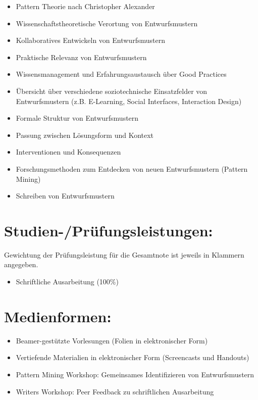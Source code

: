 \begin{itemize}
\tightlist
\item
  Pattern Theorie nach Christopher Alexander
\item
  Wissenschaftstheoretische Verortung von Entwurfsmustern
\item
  Kollaboratives Entwickeln von Entwurfsmustern
\item
  Praktische Relevanz von Entwurfsmustern
\item
  Wissensmanagement und Erfahrungsaustausch über Good Practices
\item
  Übersicht über verschiedene soziotechnische Einsatzfelder von
  Entwurfsmustern (z.B. E-Learning, Social Interfaces, Interaction
  Design)
\item
  Formale Struktur von Entwurfsmustern
\item
  Passung zwischen Lösungsform und Kontext
\item
  Interventionen und Konsequenzen
\item
  Forschungsmethoden zum Entdecken von neuen Entwurfsmustern (Pattern
  Mining)
\item
  Schreiben von Entwurfsmustern
\end{itemize}

\section*{Studien-/Prüfungsleistungen:\label{/mi-2017/modulbeschreibungen-master/MA_SC_Soziotechnische_Entwurfsmuster}}\label{studien-pruxfcfungsleistungenpathlabelmi-2017modulbeschreibungen-mastermaux5fscux5fsoziotechnischeux5fentwurfsmuster}

Gewichtung der Prüfungsleistung für die Gesamtnote ist jeweils in
Klammern angegeben.

\begin{itemize}
\tightlist
\item
  Schriftliche Ausarbeitung (100\%)
\end{itemize}

\section*{Medienformen:\label{/mi-2017/modulbeschreibungen-master/MA_SC_Soziotechnische_Entwurfsmuster}}\label{medienformenpathlabelmi-2017modulbeschreibungen-mastermaux5fscux5fsoziotechnischeux5fentwurfsmuster}

\begin{itemize}
\tightlist
\item
  Beamer-gestützte Vorlesungen (Folien in elektronischer Form)
\item
  Vertiefende Materialien in elektronischer Form (Screencasts und
  Handouts)
\item
  Pattern Mining Workshop: Gemeinsames Identifizieren von
  Entwurfsmustern
\item
  Writers Workshop: Peer Feedback zu schriftlichen Ausarbeitung
\end{itemize}


